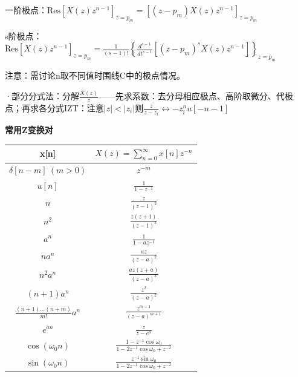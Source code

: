 一阶极点：$\text{Res}[X(z)z^{n-1}]_{z=p_m}=[(z-p_m)X(z)z^{n-1}]_{z=p_m}$

s阶极点：$\text{Res}[X(z)z^{n-1}]_{z=p_m}=\tfrac{1}{(s-1)!}\left\{\tfrac{d^{s-1}}{dt^{s-1}}[(z-p_m)^sX(z)z^{n-1}]\right\}_{z=p_m}$

注意：需讨论n取不同值时围线C中的极点情况。

·部分分式法：分解$\frac{X(z)}{z}$——先求系数：去分母相应极点、高阶取微分、代极点；再求各分式IZT：注意$|z|<|z_i|$则$\frac{z}{z-z_i}\leftrightarrow-z_i^nu[-n-1]$

\textbf{常用Z变换对}

\begin{center}
\begin{tabular}{|c|c|}
\hline
x[n] & $X(z)=\sum_{n=0}^{\infty}x[n]z^{-n}$ \\
\hline
$\delta\left[n-m\right]\ \left(m>0\right)$ & $z^{-m} $ \\
\hline
$ u[n]$ & $\frac{1}{1-z^{-1}}$ \\
\hline
$ n $ & $\frac{z}{(z-1)^{2}}$ \\
\hline
$ n^{2} $ & $\frac{z(z+1)}{(z-1)^{3}}$ \\
\hline
$ a^{n} $ & $\frac{1}{1-az^{-1}}$ \\
\hline
$ na^{n} $ & $\frac{az}{(z-a)^{2}}$ \\
\hline
$ n^{2}a^{n} $ & $\frac{az(z+a)}{(z-a)^{3}}$ \\
\hline
$(n+1)a^{n} $ & $\frac{z^2}{(z-a)^{2}}$ \\
\hline
$\frac{(n+1)...(n+m)}{m!}a^{n} $ & $\frac{z^{m+1}}{(z-a)^{m+1}}$ \\
\hline
$e^{an} $ & $\frac{z}{z-e^{a}}$ \\
\hline
$ \cos(\omega_{0}n)$ & $ \frac{1-z^{-1}\cos\omega_{0}}{1-2z^{-1}\cos\omega_{0}+z^{-2}}$ \\
\hline
$ \sin(\omega_{0}n)$ & $\frac{z^{-1}\sin\omega_{0}}{1-2z^{-1}\cos\omega_{0}+z^{-2}}$ \\
\hline
\end{tabular}
\end{center}
